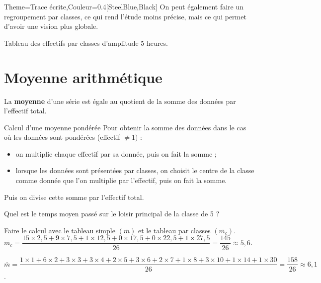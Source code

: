 \begin{Maquette}[Cours]{Theme={Trace écrite},Couleur={0.4[SteelBlue,Black]}}
      On peut également faire un regroupement par classes, ce qui rend l'étude moins précise, mais ce qui permet d'avoir une vision plus globale.

      \begin{exemple*}{}
         Tableau des effectifs par classes d'amplitude 5 heures.
         \begin{center}
            {\small
             }
         \end{center}
      \end{exemple*}


   \section{Moyenne arithmétique}

      \begin{definition*}{}
         La \textbf{moyenne} d'une série est égale au quotient de la somme des données par l'effectif total.
      \end{definition*}

      \begin{methode*}{Calcul d'une moyenne pondérée}
         Pour obtenir la somme des données dans le cas où les données sont pondérées (effectif $\neq1)$ :
         \begin{itemize}
            \item on multiplie chaque effectif par sa donnée, puis on fait la somme ;
            \item lorsque les données sont présentées par classes, on choisit le centre de la classe comme donnée que l'on multiplie par l'effectif, puis on fait la somme.
         \end{itemize}
         Puis on divise cette somme par l'effectif total.
         \begin{exbmethode}
            Quel est le temps moyen passé sur le loisir principal de la classe de 5 ? \par
            Faire le calcul avec le tableau simple $(\overline{m})$ et le tableau par classes $(\overline{m_c})$.
            \tcblower
               $\overline{m_c} =\dfrac{15\times2,5+9\times7,5+1\times12,5+0\times17,5+0\times22,5+1\times27,5}{26} =\dfrac{145}{26} \approx5,6$. \par \smallskip
               {\small $\overline{m} =\dfrac{1\times1+6\times2+3\times3+3\times4+2\times5+3\times6+2\times7+1\times8+3\times10+1\times14+1\times30}{26} =\dfrac{158}{26} \approx6,1$.}
         \end{exbmethode}
      \end{methode*}

\end{Maquette}


